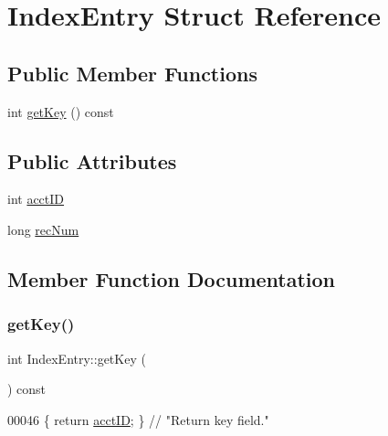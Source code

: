 \hypertarget{struct_index_entry}{}\section{Index\+Entry Struct Reference}
\label{struct_index_entry}
\subsection*{Public Member Functions}
\begin{DoxyCompactItemize}
\item 
int \hyperlink{struct_index_entry_ae6bf49024eb83f8c6a2b99c1b07df8ac}{get\+Key} () const
\end{DoxyCompactItemize}
\subsection*{Public Attributes}
\begin{DoxyCompactItemize}
\item 
int \hyperlink{struct_index_entry_aa5008695f70f365c7959d42ccca0fa13}{acct\+ID}
\item 
long \hyperlink{struct_index_entry_a3f71077b699f2d718ca60df893c4c470}{rec\+Num}
\end{DoxyCompactItemize}


\subsection{Member Function Documentation}
\hypertarget{struct_index_entry_ae6bf49024eb83f8c6a2b99c1b07df8ac}{}\label{struct_index_entry_ae6bf49024eb83f8c6a2b99c1b07df8ac} 
\subsubsection{\texorpdfstring{get\+Key()}{getKey()}}
{\footnotesize\ttfamily int Index\+Entry\+::get\+Key (\begin{DoxyParamCaption}{ }\end{DoxyParamCaption}) const\hspace{0.3cm}{\ttfamily [inline]}}


\begin{DoxyCode}
00046         \{ \textcolor{keywordflow}{return} \hyperlink{struct_index_entry_aa5008695f70f365c7959d42ccca0fa13}{acctID}; \}   \textcolor{comment}{// "Return key field."}
\end{DoxyCode}


